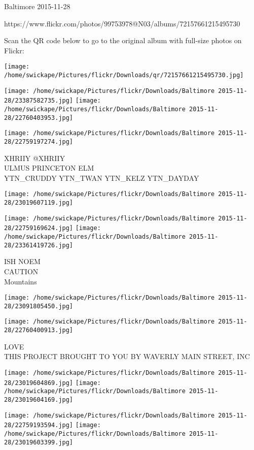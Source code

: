 \documentclass[10pt,letterpaper]{article}
\begin{document}
Baltimore 2015-11-28

https://www.flickr.com/photos/99753978@N03/albums/72157661215495730

Scan the QR code below to go to the original album with full-size photos on Flickr:

\texttt{[image: /home/swickape/Pictures/flickr/Downloads/qr/72157661215495730.jpg]}
\pagebreak

\texttt{[image: /home/swickape/Pictures/flickr/Downloads/Baltimore 2015-11-28/23387582735.jpg]}
\texttt{[image: /home/swickape/Pictures/flickr/Downloads/Baltimore 2015-11-28/22760403953.jpg]}

\texttt{[image: /home/swickape/Pictures/flickr/Downloads/Baltimore 2015-11-28/22759197274.jpg]}

XHRIIY @XHRIIY\\
ULMUS PRINCETON ELM\\
YTN\_CRUDDY YTN\_TWAN YTN\_KELZ YTN\_DAYDAY
\pagebreak

\texttt{[image: /home/swickape/Pictures/flickr/Downloads/Baltimore 2015-11-28/23019607119.jpg]}

\vspace{0.25in}
\texttt{[image: /home/swickape/Pictures/flickr/Downloads/Baltimore 2015-11-28/22759169624.jpg]}
\texttt{[image: /home/swickape/Pictures/flickr/Downloads/Baltimore 2015-11-28/23361419726.jpg]}

ISH NOEM\\
CAUTION\\
Mountains
\pagebreak

\texttt{[image: /home/swickape/Pictures/flickr/Downloads/Baltimore 2015-11-28/23091805450.jpg]}

\vspace{0.25in}
\texttt{[image: /home/swickape/Pictures/flickr/Downloads/Baltimore 2015-11-28/22760400913.jpg]}

LOVE\\
THIS PROJECT BROUGHT TO YOU BY WAVERLY MAIN STREET, INC
\pagebreak

\texttt{[image: /home/swickape/Pictures/flickr/Downloads/Baltimore 2015-11-28/23019604869.jpg]}
\texttt{[image: /home/swickape/Pictures/flickr/Downloads/Baltimore 2015-11-28/23019604169.jpg]}

\texttt{[image: /home/swickape/Pictures/flickr/Downloads/Baltimore 2015-11-28/22759193594.jpg]}
\texttt{[image: /home/swickape/Pictures/flickr/Downloads/Baltimore 2015-11-28/23019603399.jpg]}
\end{document}
